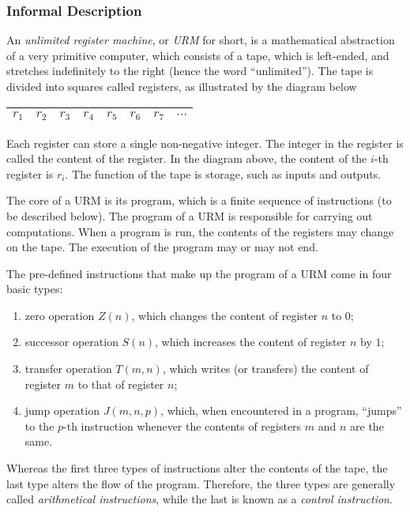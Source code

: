 \documentclass[12pt]{article}
\begin{document}

\subsubsection*{Informal Description}
An \emph{unlimited register machine}, or \emph{URM} for short, is a mathematical abstraction of a very primitive computer, which consists of a tape, which is left-ended, and stretches indefinitely to the right (hence the word ``unlimited'').  The tape is divided into squares called registers, as illustrated by the diagram below
\begin{center}
\begin{tabular}{|c|c|c|c|c|c|c|c}
\hline
$r_1$ & $r_2$ & $r_3$ & $r_4$ & $r_5$ & $r_6$ & $r_7$ & $\cdots$ \\
\hline
\end{tabular}
\end{center}
Each register can store a single non-negative integer.  The integer in the register is called the content of the register.  In the diagram above, the content of the $i$-th register is $r_i$.  The function of the tape is storage, such as inputs and outputs.

The core of a URM is its program, which is a finite sequence of instructions (to be described below).  The program of a URM is responsible for carrying out computations.  When a program is run, the contents of the registers may change on the tape.  The execution of the program may or may not end.

The pre-defined instructions that make up the program of a URM come in four basic types:
\begin{enumerate}
\item zero operation $Z(n)$, which changes the content of register $n$ to $0$;
\item successor operation $S(n)$, which increases the content of register $n$ by $1$;
\item transfer operation $T(m,n)$, which writes (or transfers) the content of register $m$ to that of register $n$;
\item jump operation $J(m,n,p)$, which, when encountered in a program, ``jumps'' to the $p$-th instruction whenever the contents of registers $m$ and $n$ are the same.
\end{enumerate}
Whereas the first three types of instructions alter the contents of the tape, the last type alters the flow of the program.  Therefore, the three types are generally called \emph{arithmetical instructions}, while the last is known as a \emph{control instruction}.
\end{document}
